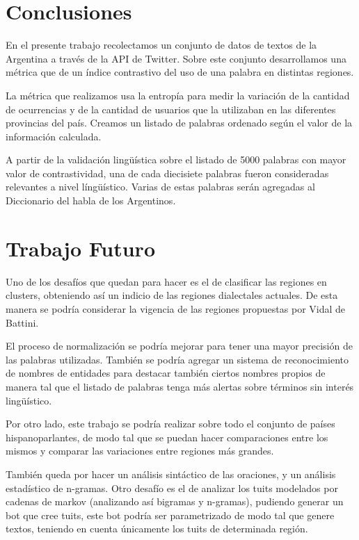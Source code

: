 \section{Conclusiones}
En el presente trabajo recolectamos un conjunto de datos de textos de la Argentina a través de la API de Twitter. Sobre este conjunto desarrollamos una métrica que de un índice contrastivo del uso de una palabra en distintas regiones.

La métrica que realizamos usa la entropía para medir la variación de la cantidad de ocurrencias y de la cantidad de usuarios que la utilizaban en las diferentes provincias del país. Creamos un listado de palabras ordenado según el valor de la información calculada. 

A partir de la validación lingüística sobre el listado de 5000 palabras con mayor valor de contrastividad, una de cada diecisiete palabras fueron consideradas relevantes a nivel língüístico. Varias de estas palabras serán agregadas al Diccionario del habla de los Argentinos. 

\section{Trabajo Futuro}

Uno de los desafíos que quedan para hacer es el de clasificar las regiones en clusters, obteniendo así un indicio de las regiones dialectales actuales. De esta manera se podría considerar la vigencia de las regiones propuestas por Vidal de Battini. %

El proceso de normalización se podría mejorar para tener una mayor precisión de las palabras utilizadas. También se podría agregar un sistema de reconocimiento de nombres de entidades para destacar también ciertos nombres propios de manera tal que el listado de palabras tenga más alertas sobre términos sin interés lingüístico.

Por otro lado, este trabajo se podría realizar sobre todo el conjunto de países hispanoparlantes, de modo tal que se puedan hacer comparaciones entre los mismos y comparar las variaciones entre regiones más grandes.

También queda por hacer un análisis sintáctico de las oraciones, y un análisis estadístico de n-gramas.
Otro desafío es el de analizar los tuits modelados por cadenas de markov (analizando así bigramas y n-gramas), pudiendo generar un bot que cree tuits, este bot podría ser parametrizado de modo tal que genere textos, teniendo en cuenta únicamente los tuits de determinada región.

